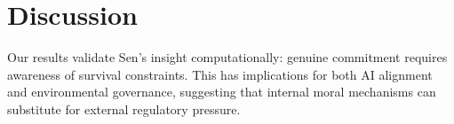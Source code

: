 \documentclass[12pt]{article}
\begin{document}
\section{Discussion}
Our results validate Sen's insight computationally: genuine commitment requires awareness of survival constraints. This has implications for both AI alignment and environmental governance, suggesting that internal moral mechanisms can substitute for external regulatory pressure.



\end{document}
